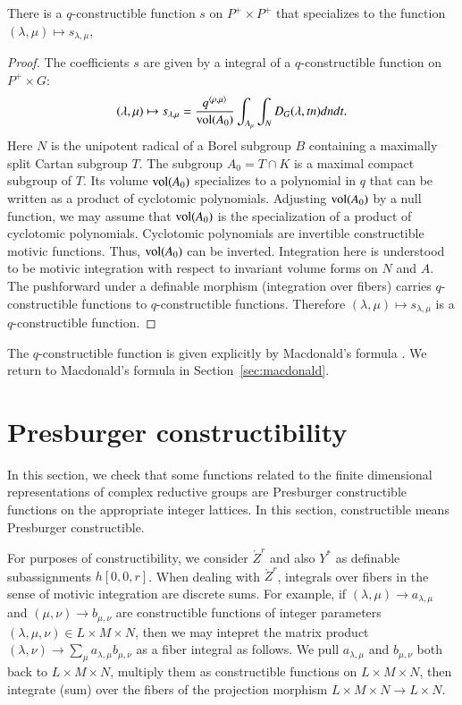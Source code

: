 \begin{lemma}\label{lemma:satake} There is a $q$-constructible function $s$ on $P^+\times P^+$ that
specializes to the function $(\lambda,\mu)\mapsto s_{\lambda,\mu}$,
\end{lemma}

\begin{proof} 
The coefficients $s$ are given by a integral of a $q$-constructible function on $P^+\times G$:
\begin{equation}\label{eqn:s}
(\lambda,\mu)\mapsto s_{\lambda,\mu}=\frac{q^{\langle\rho,\mu\rangle}}{{\operatorname{vol}}(A_0)} \int_{A_\mu} \int_N D_G(\lambda,t n) dn dt.
\end{equation}
Here $N$ is the unipotent radical of a Borel subgroup $B$ containing a maximally split Cartan subgroup
$T$.  The subgroup $A_0 = T\cap K$ is a maximal compact subgroup of $T$.  Its volume ${\operatorname{vol}}(A_0)$ specializes
to a polynomial in $q$ that can be written as a product of cyclotomic polynomials.  Adjusting ${\operatorname{vol}}(A_0)$ by a 
null function, we may assume that ${\operatorname{vol}}(A_0)$ is the specialization of a product of cyclotomic polynomials.
Cyclotomic polynomials are invertible constructible motivic functions.  Thus, ${\operatorname{vol}}(A_0)$ can be inverted.
  Integration here is understood to be motivic integration with respect to invariant volume forms on $N$ and $A$.
The pushforward under a definable morphism (integration over fibers) carries $q$-constructible functions
to $q$-constructible functions.
Therefore $(\lambda,\mu)\mapsto s_{\lambda,\mu}$ is a $q$-constructible function.
\end{proof}

The $q$-constructible function is given explicitly by Macdonald's formula \cite{casselman1980unramified}.
We return to Macdonald's formula in Section~\ref{sec:macdonald}.


\section{Presburger constructibility}

In this section,
we check that some functions related to the finite dimensional representations of complex reductive groups
are Presburger constructible functions on the appropriate integer lattices.  In this section, constructible means Presburger
constructible.

\begin{remark}\label{rem:matrix}
For purposes of constructibility, we consider $\ring{Z}^r$ and also $Y^*$ as 
definable subassignments $h[0,0,r]$. When dealing with $\ring{Z}^r$, integrals over fibers
in the sense of motivic integration are discrete sums.  For example, if $(\lambda,\mu)\to a_{\lambda,\mu}$
and $(\mu,\nu)\to b_{\mu,\nu}$ are constructible functions of integer parameters $(\lambda,\mu,\nu)\in L\times M\times N$,
then we may intepret the matrix product $(\lambda,\nu)\to \sum_{\mu} a_{\lambda,\mu} b_{\mu,\nu}$ as a
fiber integral as follows.  We pull $a_{\lambda,\mu}$ and $b_{\mu,\nu}$ both back to $L\times M\times N$, multiply
them as constructible functions on $L\times M\times N$, then integrate (sum) over the fibers of the projection morphism
$L\times M\times N\to L\times N$.
\end{remark}

